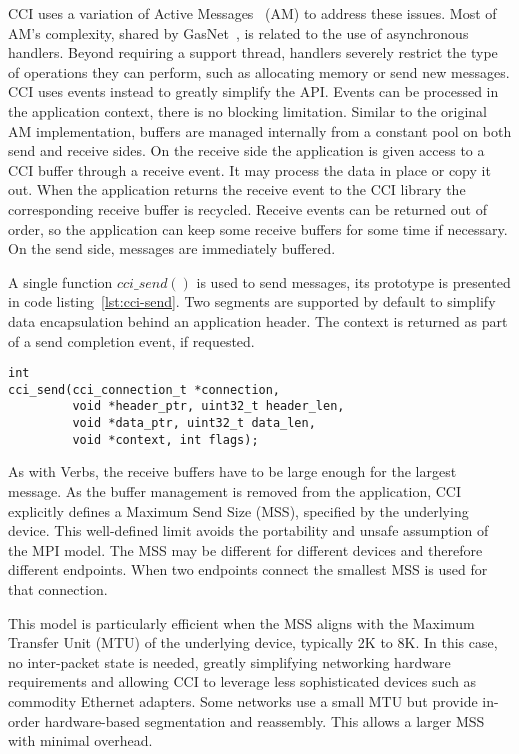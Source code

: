 CCI uses a variation of Active Messages~\cite{voneicken-isca92} (AM) 
to address these issues. 
Most of AM's complexity, shared by GasNet~\cite{gasnet}, is related 
to the use of asynchronous handlers. Beyond requiring a support thread, handlers severely restrict the type of operations they can perform, such as allocating memory or send new messages. CCI uses events instead to greatly simplify the API. Events can be processed in the application context, there is no blocking limitation. Similar to the original AM implementation, buffers are managed 
internally from a constant pool on both send and receive sides. 
On the receive side the application is given access to a CCI buffer through 
a receive event. It may process the data in place or copy it out. When the 
application returns the receive event to the CCI library the corresponding 
receive buffer is recycled. Receive events can be returned out of order, so 
the application can keep some receive buffers for some time if necessary. 
On the send side, messages are immediately buffered.

A single function $cci\_send()$ is used to send messages, its prototype is presented in code listing~\ref{lst:cci-send}. Two segments are supported by default to simplify data encapsulation behind an application header. The context is returned as part of a send completion event, if requested.

\lstset{language=C, frame=single, basicstyle=\ttfamily\small}
\begin{lstlisting}[label=lst:cci-send,caption=CCI send prototype]
int 
cci_send(cci_connection_t *connection, 
         void *header_ptr, uint32_t header_len, 
         void *data_ptr, uint32_t data_len, 
         void *context, int flags);
\end{lstlisting}

As with Verbs, the receive buffers have to be large enough for the largest 
message. As the buffer management is removed from the application, CCI 
explicitly defines a Maximum Send Size (MSS), specified by the underlying  
device. This well-defined limit avoids the portability and unsafe assumption 
of the MPI model. The MSS may be different for 
different devices and therefore different endpoints. When two endpoints 
connect the smallest MSS is used for that connection.

This model is particularly efficient when the MSS aligns with the Maximum 
Transfer Unit (MTU) of the underlying device, typically 2K to 8K. 
In this case, no inter-packet state is needed, greatly simplifying
networking hardware requirements and allowing CCI to leverage less 
sophisticated devices such as commodity Ethernet adapters. 
Some networks use a small MTU but provide in-order hardware-based segmentation and reassembly. This allows a larger MSS with minimal overhead.

